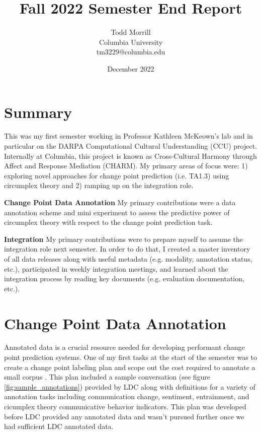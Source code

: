 \documentclass[12pt]{article}
\title{Fall 2022 Semester End Report}
\author{Todd Morrill\\
Columbia University\\
tm3229@columbia.edu}
\date{December 2022}
\begin{document}
\maketitle

\section{Summary}
This was my first semester working in Professor Kathleen McKeown's lab and in particular on the DARPA Computational Cultural Understanding (CCU) \cite{DARPA_2021} project. Internally at Columbia, this project is known as Cross-Cultural Harmony through Affect and Response Mediation (CHARM). My primary areas of focus were: 1) exploring novel approaches for change point prediction (i.e. TA1.3) using circumplex theory and 2) ramping up on the integration role.

\textbf{Change Point Data Annotation} My primary contributions were a data annotation scheme and mini experiment to assess the predictive power of circumplex theory with respect to the change point prediction task.

\textbf{Integration} My primary contributions were to prepare myself to assume the integration role next semester. In order to do that, I created a master inventory of all data releases along with useful metadata (e.g. modality, annotation status, etc.), participated in weekly integration meetings, and learned about the integration process by reading key documents (e.g. evaluation documentation, etc.).

\section{Change Point Data Annotation}
Annotated data is a crucial resource needed for developing performant change point prediction systems. One of my first tasks at the start of the semester was to create a change point labeling plan and scope out the cost required to annotate a small corpus \cite{Morrill_2022a}. This plan included a sample conversation (see figure \ref{fig:sample_annotations}) provided by LDC along with definitions for a variety of annotation tasks including communication change, sentiment, entrainment, and cicumplex theory communicative behavior indicators. This plan was developed before LDC provided any annotated data and wasn't pursued further once we had sufficient LDC annotated data. 
\end{document}
